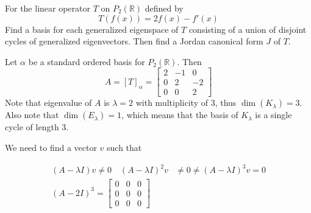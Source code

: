 \begin{homeworkProblem}

For the linear operator $T$ on $P_2(\mathbb{R})$ defined by
\[
  T(f(x)) = 2f(x) - f'(x)
\]
Find a basis for each generalized eigenspace of $T$ consisting of a union of disjoint cycles of generalized eigenvectors. Then find a Jordan canonical form $J$ of $T$.

\solution

Let $\alpha$ be a standard ordered basis for $P_2(\mathbb{R})$. Then
\[
  A = [T]_\alpha = \begin{bmatrix}
    2 & -1 & 0\\
    0 & 2 & -2\\
    0 & 0 & 2
  \end{bmatrix}
\]
Note that eigenvalue of $A$ is $\lambda = 2$ with multiplicity of $3$, thus $\dim(K_\lambda) = 3$. Also note that $\dim(E_\lambda) = 1$, which means that the basis of $K_\lambda$ is a single cycle of length $3$.

We need to find a vector $v$ such that

\[
\begin{aligned}
  (A - \lambda I)v \neq 0 \quad(A - \lambda I)^2v &\neq 0 \neq (A - \lambda I)^3v = 0 \\
  (A-2I)^3 = \begin{bmatrix}
    0 & 0 & 0\\
    0 & 0 & 0\\
    0 & 0 & 0
  \end{bmatrix}
\end{aligned}
\]


\end{homeworkProblem}
